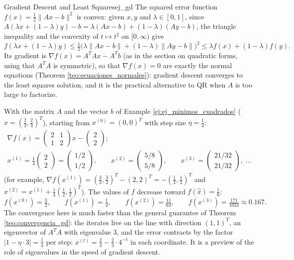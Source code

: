 \documentclass[11pt, a4paper]{article}
\begin{document}
\begin{ejemplo}{Gradient Descent and Least Squares}{ej_gd}
The squared error function $f(x) = \frac{1}{2} \|Ax - b\|^2$ is convex: given $x, y$ and $\lambda \in [0,1]$, since $A(\lambda x + (1-\lambda) y) - b = \lambda (Ax - b) + (1-\lambda)(Ay - b)$, the triangle inequality and the convexity of $t \mapsto t^2$ on $[0, \infty)$ give
\[
f(\lambda x + (1-\lambda) y) \le \tfrac{1}{2} \big( \lambda \|Ax - b\| + (1-\lambda) \|Ay - b\| \big)^2 \le \lambda f(x) + (1-\lambda) f(y).
\]
Its gradient is $\nabla f(x) = A^T A x - A^T b$ (as in the section on quadratic forms, using that $A^T A$ is symmetric), so that $\nabla f(x) = 0$ are exactly the normal equations (Theorem \ref{teo:ecuaciones_normales}): gradient descent converges to the least squares solution, and it is the practical alternative to QR when $A$ is too large to factorize.

With the matrix $A$ and the vector $b$ of Example \ref{ej:ej_minimos_cuadrados} ($\hat{x} = (\frac{2}{3}, \frac{2}{3})^T$), starting from $x^{(0)} = (0,0)^T$ with step size $\eta = \frac{1}{4}$:
\begin{gather*}
\nabla f(x) = \begin{pmatrix} 2 & 1 \\ 1 & 2 \end{pmatrix} x - \begin{pmatrix} 2 \\ 2 \end{pmatrix};
\\
x^{(1)} = \tfrac{1}{4} \begin{pmatrix} 2 \\ 2 \end{pmatrix} = \begin{pmatrix} 1/2 \\ 1/2 \end{pmatrix}, \qquad
x^{(2)} = \begin{pmatrix} 5/8 \\ 5/8 \end{pmatrix}, \qquad
x^{(3)} = \begin{pmatrix} 21/32 \\ 21/32 \end{pmatrix}, \; \dots
\end{gather*}
(for example, $\nabla f(x^{(1)}) = (\frac{3}{2}, \frac{3}{2})^T - (2,2)^T = -(\frac{1}{2}, \frac{1}{2})^T$ and $x^{(2)} = x^{(1)} + \frac{1}{4} (\frac{1}{2}, \frac{1}{2})^T$). The values of $f$ decrease toward $f(\hat{x}) = \frac{1}{6}$:
\[
f(x^{(0)}) = \tfrac{3}{2}, \qquad f(x^{(1)}) = \tfrac{1}{4}, \qquad f(x^{(2)}) = \tfrac{11}{64}, \qquad f(x^{(3)}) = \tfrac{171}{1024} \approx 0.167.
\]
The convergence here is much faster than the general guarantee of Theorem \ref{teo:convergencia_gd}: the iterates live on the line with direction $(1,1)^T$, an eigenvector of $A^T A$ with eigenvalue $3$, and the error contracts by the factor $|1 - \eta \cdot 3| = \frac{1}{4}$ per step: $x^{(t)} = \frac{2}{3} - \frac{2}{3} \cdot 4^{-t}$ in each coordinate. It is a preview of the role of eigenvalues in the speed of gradient descent.
\end{ejemplo}
\end{document}
